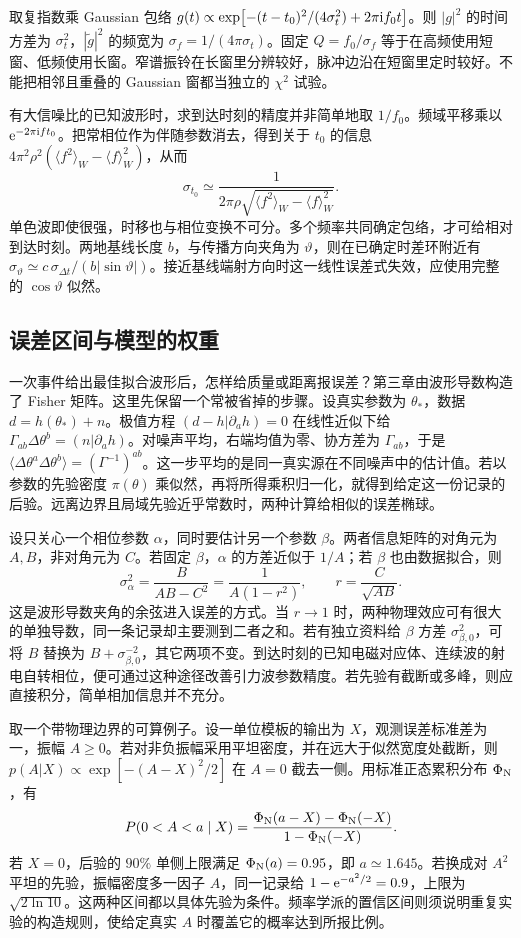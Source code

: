 取复指数乘 Gaussian 包络 $g(t)\propto\exp[-(t-t_0)^2/(4\sigma_t^2)+2\pi\mathrm{i} f_0 t]$。则 $|g|^2$ 的时间方差为 $\sigma_t^2$，$|\tilde g|^2$ 的频宽为 $\sigma_f=1/(4\pi\sigma_t)$。固定 $Q=f_0/\sigma_f$ 等于在高频使用短窗、低频使用长窗。窄谱振铃在长窗里分辨较好，脉冲边沿在短窗里定时较好。不能把相邻且重叠的 Gaussian 窗都当独立的 $\chi^2$ 试验。

有大信噪比的已知波形时，求到达时刻的精度并非简单地取 $1/f_0$。频域平移乘以 $\mathrm{e}^{-2\pi\mathrm{i} ft_0}$。把常相位作为伴随参数消去，得到关于 $t_0$ 的信息 $4\pi^2\rho^2(\langle f^2\rangle_W-\langle f\rangle_W^2)$，从而
\[
 \sigma_{t_0}\simeq \frac{1}{2\pi\rho\sqrt{\langle f^2\rangle_W-\langle f\rangle_W^2}} .
\]
单色波即使很强，时移也与相位变换不可分。多个频率共同确定包络，才可给相对到达时刻。两地基线长度 $b$，与传播方向夹角为 $\vartheta$，则在已确定时差环附近有 $\sigma_\vartheta\simeq c\,\sigma_{\Delta t}/(b|\sin\vartheta|)$。接近基线端射方向时这一线性误差式失效，应使用完整的 $\cos\vartheta$ 似然。

\subsection{误差区间与模型的权重}
一次事件给出最佳拟合波形后，怎样给质量或距离报误差？第三章由波形导数构造了 Fisher 矩阵。这里先保留一个常被省掉的步骤。设真实参数为 $\theta_*$，数据 $d=h(\theta_*)+n$。极值方程 $(d-h|\partial_a h)=0$ 在线性近似下给 $\Gamma_{ab}\Delta\theta^b=(n|\partial_a h)$。对噪声平均，右端均值为零、协方差为 $\Gamma_{ab}$，于是 $\langle\Delta\theta^a\Delta\theta^b\rangle=(\Gamma^{-1})^{ab}$。这一步平均的是同一真实源在不同噪声中的估计值。若以参数的先验密度 $\pi(\theta)$ 乘似然，再将所得乘积归一化，就得到给定这一份记录的后验。远离边界且局域先验近乎常数时，两种计算给相似的误差椭球。

设只关心一个相位参数 $\alpha$，同时要估计另一个参数 $\beta$。两者信息矩阵的对角元为 $A,B$，非对角元为 $C$。若固定 $\beta$，$\alpha$ 的方差近似于 $1/A$；若 $\beta$ 也由数据拟合，则
\[
 \sigma_\alpha^2=\frac{B}{AB-C^2}
 =\frac{1}{A(1-r^2)},\qquad r=\frac{C}{\sqrt{AB}} .
\]
这是波形导数夹角的余弦进入误差的方式。当 $r\to1$ 时，两种物理效应可有很大的单独导数，同一条记录却主要测到二者之和。若有独立资料给 $\beta$ 方差 $\sigma_{\beta,0}^2$，可将 $B$ 替换为 $B+\sigma_{\beta,0}^{-2}$，其它两项不变。到达时刻的已知电磁对应体、连续波的射电自转相位，便可通过这种途径改善引力波参数精度。若先验有截断或多峰，则应直接积分，简单相加信息并不充分。

取一个带物理边界的可算例子。设一单位模板的输出为 $X$，观测误差标准差为一，振幅 $A\ge0$。若对非负振幅采用平坦密度，并在远大于似然宽度处截断，则 $p(A|X)\propto\exp[-(A-X)^2/2]$ 在 $A=0$ 截去一侧。用标准正态累积分布 $\Phi_{\rm N}$，有
\[
 P(0<A<a\mid X)=
 \frac{\Phi_{\rm N}(a-X)-\Phi_{\rm N}(-X)}{1-\Phi_{\rm N}(-X)} .
\]
若 $X=0$，后验的 $90\%$ 单侧上限满足 $\Phi_{\rm N}(a)=0.95$，即 $a\simeq1.645$。若换成对 $A^2$ 平坦的先验，振幅密度多一因子 $A$，同一记录给 $1-\mathrm{e}^{-a^2/2}=0.9$，上限为 $\sqrt{2\ln10}$。这两种区间都以具体先验为条件。频率学派的置信区间则须说明重复实验的构造规则，使给定真实 $A$ 时覆盖它的概率达到所报比例。

